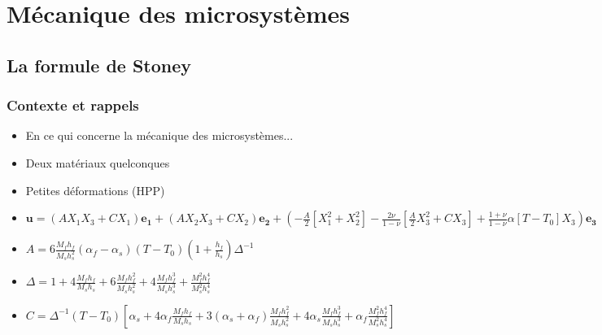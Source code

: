 
\section{Mécanique des microsystèmes} %


\subsection{La formule de Stoney} %

\begin{frame}
    \frametitle{Contexte et rappels}
    \begin{itemize}
        \item En ce qui concerne la mécanique des microsystèmes...
        \item Deux matériaux quelconques
        \item Petites déformations (HPP)
        \item $\bm{u} = (AX_1X_3 + CX_1)\bm{e_1} + (AX_2X_3 + CX_2)\bm{e_2} + (-\frac{A}{2}\left[X_1^2+X_2^2\right]-\frac{2\nu}{1-\nu}\left[\frac{A}{2}X_3^2+CX_3\right]+\frac{1+\nu}{1-\nu}\alpha\left[T-T_0\right]X_3)\bm{e_3}$
        \item $A = 6\frac{M_fh_f}{M_sh_s^2}(\alpha_f-\alpha_s)(T-T_0)(1+\frac{h_f}{h_s})\Delta^{-1}$
        \item $\Delta = 1+4\frac{M_fh_f}{M_sh_s}+6\frac{M_fh_f^2}{M_sh_s^2}+4\frac{M_fh_f^3}{M_sh_s^3}+\frac{M_f^2h_f^4}{M_s^2h_s^4}$
        \item $C = \Delta^{-1}(T-T_0)\left[\alpha_s + 4 \alpha_f \frac{M_fh_f}{M_sh_s} + 3 (\alpha_s + \alpha_f)\frac{M_fh_f^2}{M_sh_s^2} + 4\alpha_s \frac{M_fh_f^3}{M_sh_s^3} + \alpha_f \frac{M_f^2h_f^4}{M_s^2h_s^4}  \right]$
    \end{itemize}
\end{frame}

    
